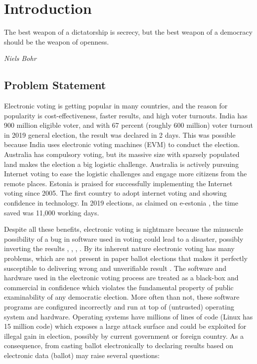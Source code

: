 \chapter{Introduction}
\label{cha:intro}

\epigraph{The best weapon of a dictatorship is secrecy, but the best weapon of a democracy should be the weapon of openness.} 
{\textit{Niels Bohr}} 

\section{Problem Statement}

	Electronic voting is getting popular in many countries, and the reason for popularity is 
	cost-effectiveness, faster results, and high voter turnouts. India has 900 million eligible voter, 
   and with 67 percent (roughly 600 million) voter turnout in 2019 general election, 
   the result was declared in 2 days. This was possible because India uses  electronic 
   voting machines (EVM) to conduct the election. Australia has 
   compulsory voting, but its massive size with sparsely populated land makes 
   the election a big logistic challenge.  Australia is actively pursuing Internet voting 
   to ease the logistic challenges and engage more citizens from the remote places. Estonia
   is praised for successfully implementing the Internet voting since 2005. The first country to
   adopt internet voting and showing confidence in technology. In 2019 elections, 
   as claimed on e-estonia \citep{Estonia},  the time saved was 11,000 working days. 
   
   Despite all these benefits, electronic voting is nightmare because the minuscule possibility of 
   a bug in software used in voting could lead to a disaster, possibly 
   inverting the results \citep{TSwiss},
   \citep{10.1007/978-3-319-22270-7_3}, \citep{ARANHA2019335},
   \citep{Feldman:2007:SAD:1323111.1323113}. 
   By its inherent nature electronic voting has many 
   problems, which are not present in paper ballot elections that makes it perfectly susceptible 
   to delivering wrong and unverifiable result  \citep{Wolchok:2010:SAI:1866307.1866309}.
   The software and hardware used in the electronic voting process  
	are treated as a black-box and commercial in confidence \citep{AEC:2013:LMM} which  
	violates the fundamental property of  public examinability of any democratic election. 
	More often than not, these software programs are configured incorrectly \citep{1301313} and 
	run at top of (untrusted) operating system and hardware.  Operating systems have
	millions of lines of code (Linux has 15 million code) which exposes a large attack surface 
	and could be  exploited for illegal gain in election, possibly by 
	current government or foreign country.  As a consequence,  from casting ballot electronically to declaring 
	results based on electronic data (ballot) may raise several questions:
	
